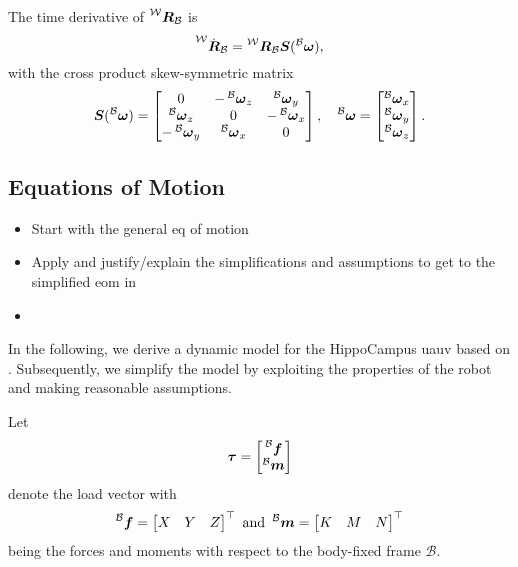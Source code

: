 The time derivative of $\Rbodyworld$ is
\begin{equation}
	\label{eq:rotation-matrix-derivative}
	\prescript{\mathcal{W}}{}{\dot{\bm{R}}_{\mathcal{B}}} = \Rbodyworld \Sb(\vangbody)
	,
\end{equation}
with the cross product skew-symmetric matrix
\begin{equation}
	\Sb(\vangbody) = 
	\begin{bmatrix}
		0 & -\vangbodyz & \vangbodyy \\
		\vangbodyz & 0 & -\vangbodyx \\
		-\vangbodyy & \vangbodyx & 0
	\end{bmatrix},
	\quad
	\vangbody = 
	\begin{bmatrix}
		\vangbodyx \\
		\vangbodyy \\ 
		\vangbodyz
	\end{bmatrix}
	.
\end{equation}



\subsection{Equations of Motion}

\begin{itemize}
	\color{red}
	\item Start with the general eq of motion
	\item Apply and justify/explain the simplifications and assumptions to get to the simplified eom in  
	\item 
\end{itemize}

In the following, we derive a dynamic model for the HippoCampus \ac{uauv} based on \cite{Fossen11}.
Subsequently, we simplify the model by exploiting the properties of the robot and making reasonable assumptions.

Let
\begin{equation}
	\mbox{$\bm{\tau}$} = 
	\begin{bmatrix}
		\prescript{\mathcal{B}}{}{\mbox{$\bm{f}$}} \\
		\prescript{\mathcal{B}}{}{\mbox{$\bm{m}$}}
	\end{bmatrix}
\end{equation}
denote the load vector with 
\begin{equation}
	\prescript{\mathcal{B}}{}{\mbox{$\bm{f}$}} = 
	\begin{bmatrix}
		X & Y & Z
	\end{bmatrix}^\top
	\text{ and }
	\prescript{\mathcal{B}}{}{\mbox{$\bm{m}$}} = 
	\begin{bmatrix}
		K & M & N
	\end{bmatrix}^\top
\end{equation}
being the forces and moments with respect to the body-fixed frame $\mathcal{B}$.

